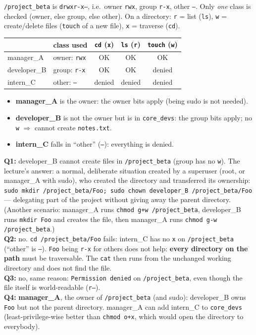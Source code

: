 \begin{algbox}[title={Solution --- ACL in Linux}]
\texttt{/project\_beta} is \texttt{drwxr-x---}, i.e.\ owner \texttt{rwx}, group
\texttt{r-x}, other \texttt{---}. Only \emph{one} class is
checked (owner, else group, else other). On a directory: \texttt{r} = list (\texttt{ls}),
\texttt{w} = create/delete files (\texttt{touch} of a new file), \texttt{x} = traverse
(\texttt{cd}).
\begin{center}
\begin{tabular}{l|l|c|c|c}
 & class used & \texttt{cd} (\texttt{x}) & \texttt{ls} (\texttt{r}) & \texttt{touch} (\texttt{w}) \\ \hline
manager\_A   & owner: \texttt{rwx}   & OK     & OK     & OK     \\
developer\_B & group: \texttt{r-x}   & OK     & OK     & denied \\
intern\_C    & other: \texttt{---}   & denied & denied & denied
\end{tabular}
\end{center}
\begin{itemize}
  \item \textbf{manager\_A} is the owner: the owner bits apply (being sudo is not
        needed).
  \item \textbf{developer\_B} is not the owner but is in \texttt{core\_devs}: the group
        bits apply; no \texttt{w} $\Rightarrow$ cannot create \texttt{notes.txt}.
  \item \textbf{intern\_C} falls in ``other'' (\texttt{---}): everything is denied.
\end{itemize}
\textbf{Q1:} developer\_B cannot create files in \texttt{/project\_beta} (group has no
\texttt{w}). The lecture's answer: a normal, deliberate situation created by a superuser (root,
or manager\_A with sudo), who created the directory and transferred its ownership:
\texttt{sudo mkdir /project\_beta/Foo; sudo chown developer\_B /project\_beta/Foo} --- delegating
part of the project without giving away the parent directory. (Another scenario: manager\_A runs
\texttt{chmod g+w /project\_beta}, developer\_B runs \texttt{mkdir Foo} and creates the file, then
manager\_A runs \texttt{chmod g-w /project\_beta}.) \\
\textbf{Q2:} no. \texttt{cd /project\_beta/Foo} fails: intern\_C has no \texttt{x} on
\texttt{/project\_beta} (``other'' is \texttt{---}). \texttt{Foo} being \texttt{r-x} for
others does not help: \textbf{every directory on the path} must be traversable. The
\texttt{cat} then runs from the unchanged working directory and does not find the file. \\
\textbf{Q3:} no, same reason: \texttt{Permission denied} on \texttt{/project\_beta}, even
though the file itself is world-readable (\texttt{r--}). \\
\textbf{Q4:} \textbf{manager\_A}, the owner of \texttt{/project\_beta} (and sudo):
developer\_B owns \texttt{Foo} but not the parent directory. manager\_A can add intern\_C
to \texttt{core\_devs} (least-privilege-wise better than \texttt{chmod o+x}, which would
open the directory to everybody).
\end{algbox}

